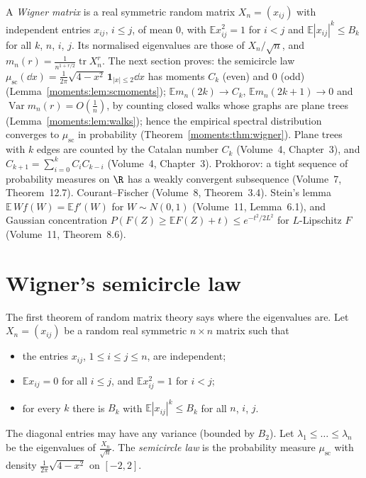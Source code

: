 \begin{reminder}
A \emph{Wigner matrix} is a real symmetric random matrix $X_n=(x_{ij})$ with independent entries $x_{ij}$, $i\le j$, of mean $0$, with $\mathbb Ex_{ij}^2=1$ for $i<j$ and $\mathbb E|x_{ij}|^k\le B_k$ for all $k$, $n$, $i$, $j$. Its
normalised eigenvalues are those of $X_n/\sqrt n$, and $m_n(r)=\frac1{n^{1+r/2}}\operatorname{tr}X_n^r$. The next section proves: the semicircle law $\mu_{\mathrm{sc}}(\dd x)=\frac1{2\pi}\sqrt{4-x^2}\,\mathbf 1_{|x|\le2}\dd x$ has moments $C_k$
(even) and $0$ (odd) (Lemma~\ref{moments:lem:scmoments}); $\mathbb Em_n(2k)\to C_k$, $\mathbb Em_n(2k+1)\to0$ and $\operatorname{Var}m_n(r)=O(\frac1n)$, by counting closed walks whose graphs are plane trees (Lemma~\ref{moments:lem:walks}); hence the empirical spectral
distribution converges to $\mu_{\mathrm{sc}}$ in probability (Theorem~\ref{moments:thm:wigner}). Plane trees with $k$ edges are counted by the Catalan number $C_k$ (Volume~4, Chapter~3), and $C_{k+1}=\sum_{i=0}^kC_iC_{k-i}$ (Volume~4,
Chapter~3). Prokhorov: a tight sequence of probability measures on $\R$ has a weakly convergent subsequence (Volume~7, Theorem~12.7). Courant--Fischer (Volume~8, Theorem~3.4). Stein's lemma
$\mathbb E\,Wf(W)=\mathbb Ef'(W)$ for $W\sim N(0,1)$ (Volume~11, Lemma~6.1), and Gaussian concentration $P(F(Z)\ge\mathbb EF(Z)+t)\le e^{-t^2/2L^2}$ for $L$-Lipschitz $F$ (Volume~11, Theorem~8.6).
\end{reminder}

\section{Wigner's semicircle law}

The first theorem of random matrix theory says where the eigenvalues are. Let $X_n=(x_{ij})$ be a random real symmetric $n\times n$ matrix such that
\begin{itemize}
\item the entries $x_{ij}$, $1\le i\le j\le n$, are independent;
\item $\mathbb Ex_{ij}=0$ for all $i\le j$, and $\mathbb Ex_{ij}^2=1$ for $i<j$;
\item for every $k$ there is $B_k$ with $\mathbb E|x_{ij}|^k\le B_k$ for all $n$, $i$, $j$.
\end{itemize}
The diagonal entries may have any variance (bounded by $B_2$). Let $\lambda_1\le\dots\le\lambda_n$ be the eigenvalues of $\frac{X_n}{\sqrt n}$. The
\emph{semicircle law} is the probability measure $\mu_{\mathrm{sc}}$ with density $\frac1{2\pi}\sqrt{4-x^2}$ on $[-2,2]$.


